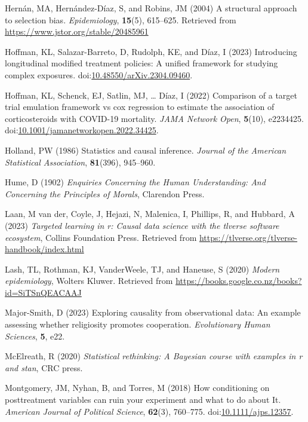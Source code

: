 \documentclass[
  single column]{article}
\newlength{\cslhangindent}
\newenvironment{CSLReferences}[2] %
 {\begin{list}{}{%
  \setlength{\itemindent}{0pt}
  \setlength{\leftmargin}{0pt}
  \setlength{\parsep}{0pt}
  \ifodd #1
   \setlength{\leftmargin}{\cslhangindent}
   \setlength{\itemindent}{-1\cslhangindent}
  \fi
  \setlength{\itemsep}{#2\baselineskip}}}
 {\end{list}}
\begin{document}
\begin{CSLReferences}{1}{0}
Hernán, MA, Hernández-Díaz, S, and Robins, JM (2004) A structural
approach to selection bias. \emph{Epidemiology}, \textbf{15}(5),
615--625. Retrieved from \url{https://www.jstor.org/stable/20485961}

Hoffman, KL, Salazar-Barreto, D, Rudolph, KE, and Díaz, I (2023)
Introducing longitudinal modified treatment policies: A unified
framework for studying complex exposures.
doi:\href{https://doi.org/10.48550/arXiv.2304.09460}{10.48550/arXiv.2304.09460}.

Hoffman, KL, Schenck, EJ, Satlin, MJ, \ldots{} Díaz, I (2022) Comparison
of a target trial emulation framework vs cox regression to estimate the
association of corticosteroids with COVID-19 mortality. \emph{JAMA
Network Open}, \textbf{5}(10), e2234425.
doi:\href{https://doi.org/10.1001/jamanetworkopen.2022.34425}{10.1001/jamanetworkopen.2022.34425}.

Holland, PW (1986) Statistics and causal inference. \emph{Journal of the
American Statistical Association}, \textbf{81}(396), 945--960.

Hume, D (1902) \emph{Enquiries Concerning the Human Understanding: And
Concerning the Principles of Morals}, Clarendon Press.

Laan, M van der, Coyle, J, Hejazi, N, Malenica, I, Phillips, R, and
Hubbard, A (2023) \emph{Targeted learning in r: Causal data science with
the tlverse software ecosystem}, Collins Foundation Press. Retrieved
from \url{https://tlverse.org/tlverse-handbook/index.html}

Lash, TL, Rothman, KJ, VanderWeele, TJ, and Haneuse, S (2020)
\emph{Modern epidemiology}, Wolters Kluwer. Retrieved from
\url{https://books.google.co.nz/books?id=SiTSnQEACAAJ}

Major-Smith, D (2023) Exploring causality from observational data: An
example assessing whether religiosity promotes cooperation.
\emph{Evolutionary Human Sciences}, \textbf{5}, e22.

McElreath, R (2020) \emph{Statistical rethinking: A {B}ayesian course
with examples in r and stan}, CRC press.

Montgomery, JM, Nyhan, B, and Torres, M (2018) How conditioning on
posttreatment variables can ruin your experiment and what to do about
It. \emph{American Journal of Political Science}, \textbf{62}(3),
760--775.
doi:\href{https://doi.org/10.1111/ajps.12357}{10.1111/ajps.12357}.


\end{CSLReferences}
\end{document}
